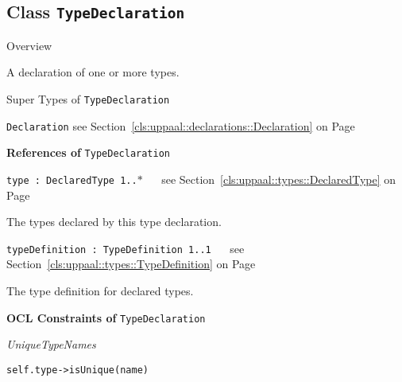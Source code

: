 \subsection{Class \bfseries \texttt{TypeDeclaration}\normalfont}
\label{cls:uppaal::declarations::TypeDeclaration} 
	
	\begin{longdescription}
		\item[Overview] 		
				

	

		A declaration of one or more types.		
		\item[Super Types of \texttt{TypeDeclaration}] ~
			\begin{longdescription}
				\item[\texttt{Declaration}] see Section~\ref{cls:uppaal::declarations::Declaration} on Page~\pageref{cls:uppaal::declarations::Declaration}						\end{longdescription}
		
	
			\item[\textbf{References of} \texttt{TypeDeclaration}] ~
			\begin{longdescription}
	\item[\texttt{type : DeclaredType 	\symbol{"5B}1..$*$\symbol{"5D}
}] ~
	see Section~\ref{cls:uppaal::types::DeclaredType} on Page~\pageref{cls:uppaal::types::DeclaredType}
	
	\nopagebreak
		
				

	

		The types declared by this type declaration.		
	\item[\texttt{typeDefinition : TypeDefinition 	\symbol{"5B}1..1\symbol{"5D}
}] ~
	see Section~\ref{cls:uppaal::types::TypeDefinition} on Page~\pageref{cls:uppaal::types::TypeDefinition}
	
	\nopagebreak
		
				

	

		The type definition for declared types.		
			\end{longdescription}
			\item[\textbf{OCL Constraints of} \texttt{TypeDeclaration}] ~
			\begin{longdescription}
	\item[\small\textit{UniqueTypeNames}] ~ 
	\nopagebreak
	
		\begin{lstlisting}[breaklines=true]
self.type->isUnique(name)		\end{lstlisting}
			\end{longdescription}
	
	\end{longdescription}
	

